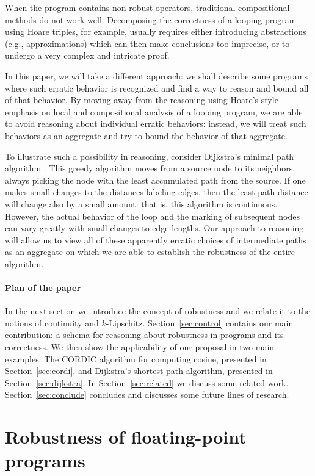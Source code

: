 \documentclass[copyright,creativecommons]{eptcs}
\begin{document}
When the program contains non-robust operators, traditional
compositional methods do not work well. Decomposing the
correctness of a looping program using Hoare triples, for example,
usually requires either introducing abstractions (e.g., approximations)
which can then make conclusions too imprecise, or to undergo a very
complex and intricate proof.

In this paper, we will take a different approach: we shall describe
some programs where such erratic behavior is recognized and find a way
to reason and bound all of that behavior.  By moving away from the
reasoning using Hoare's style emphasis on local and compositional
analysis of a looping program, we are able to avoid reasoning about
individual erratic behaviors: instead, we will treat such behaviors as
an aggregate and try to bound the behavior of that aggregate.

To illustrate such a possibility in reasoning, consider Dijkstra's
minimal path algorithm \cite{dijkstra59}.  This greedy algorithm moves
from a source node to its neighbors, always picking the node with the
least accumulated path from the source.  If one makes small changes to
the distances labeling edges, then the least path distance will change
also by a small amount: that is, this algorithm is continuous.
However, the actual behavior of the loop and the marking of subsequent
nodes can vary greatly with small changes to edge lengths.  Our
approach to reasoning will allow us to view all of these apparently
erratic choices of intermediate paths as an aggregate on which we are
able to establish the robustness of the entire algorithm.



\paragraph{Plan of the paper}
In the next section we introduce the concept of robustness and we
relate it to the notions of continuity and $k$-Lipschitz.
Section~\ref{sec:control} contains our main contribution: a schema for
reasoning about robustness in programs 
and its correctness. We then show the applicability of our proposal in
two main examples: The CORDIC algorithm for computing cosine,
presented in Section~\ref{sec:cordi}, and Dijkstra's shortest-path
algorithm, presented in Section~\ref{sec:dijkstra}.  In
Section~\ref{sec:related} we discuss some related
work. Section~\ref{sec:conclude} concludes and discusses some future
lines of research.


\section{Robustness of floating-point programs}
\end{document}
